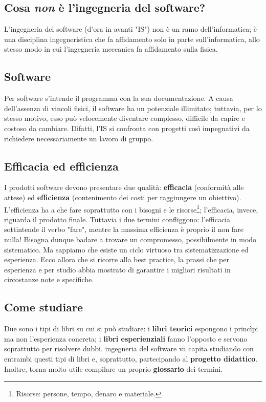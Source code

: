 \documentclass[a4paper]{article}
\begin{document}
		
	\subsection{Cosa \emph{non} è l'ingegneria del software?}

		
L'ingegneria del software (d'ora in avanti "IS") non è un ramo dell'informatica; è una disciplina ingegneristica che fa affidamento solo in parte sull'informatica, allo stesso modo in cui l'ingegneria meccanica fa affidamento sulla fisica.

		
	\subsection{Software}

		
Per software s'intende il programma con la sua documentazione. A causa dell'assenza di vincoli fisici, il software ha un potenziale illimitato; tuttavia, per lo stesso motivo, esso può velocemente diventare complesso, difficile da capire e costoso da cambiare. Difatti, l'IS si confronta con progetti così impegnativi da richiedere necessariamente un lavoro di gruppo.

		
	\subsection{Efficacia ed efficienza}

		
I prodotti software devono presentare due qualità: \textbf{efficacia} (conformità alle attese) ed \textbf{efficienza} (contenimento dei costi per raggiungere un obiettivo). L'efficienza ha a che fare soprattutto con i bisogni e le risorse\footnote{Risorse: persone, tempo, denaro e materiale.}; l'efficacia, invece, riguarda il prodotto finale. Tuttavia i due termini confliggono: l'efficacia sottintende il verbo "fare", mentre la massima efficienza è proprio il non fare nulla! Bisogna dunque badare a trovare un compromesso, possibilmente in modo sistematico. Ma sappiamo che esiste un ciclo virtuoso tra sistematizzazione ed esperienza. Ecco allora che si ricorre alla best practice, la prassi che per esperienza e per studio abbia mostrato di garantire i migliori risultati in circostanze note e specifiche.

		
	\subsection{Come studiare}

		
Due sono i tipi di libri su cui si può studiare: i \textbf{libri teorici} espongono i princìpi ma non l'esperienza concreta; i \textbf{libri esperienziali} fanno l'opposto e servono soprattutto per risolvere dubbi. ingegneria del software va capita studiando con entrambi questi tipi di libri e, soprattutto, partecipando al \textbf{progetto didattico}. Inoltre, torna molto utile compilare un proprio \textbf{glossario} dei termini.
	
\end{document}
